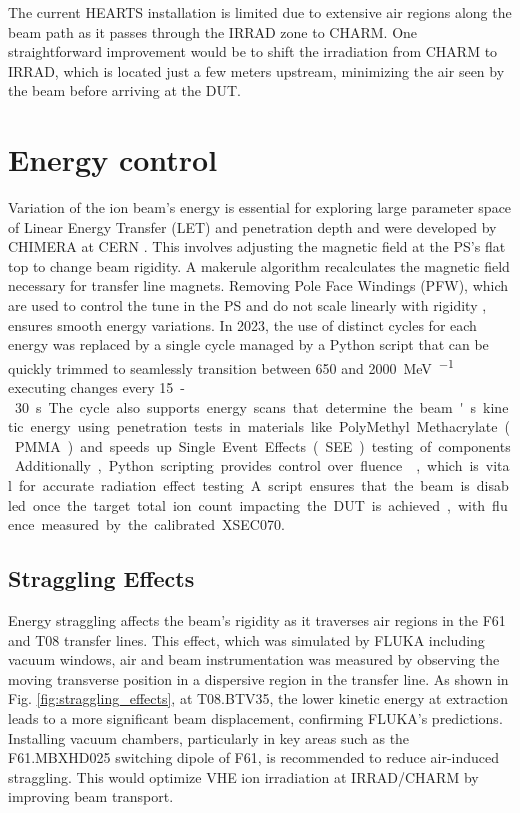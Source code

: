 \documentclass[a4paper,
               biblatex,     %
               ]{jacow}
\begin{document}
The current HEARTS installation is limited due to extensive air regions along the beam path as it passes through the IRRAD zone to CHARM. One straightforward improvement would be to shift the irradiation from CHARM to IRRAD, which is located just a few meters upstream, minimizing the air seen by the beam before arriving at the DUT.






\section{Energy control}

Variation of the ion beam’s energy is essential for exploring large parameter space of Linear Energy Transfer (LET) and penetration depth and were developed by CHIMERA at CERN \cite{fraser:ipac22-wepost012, johnson:ipac23-mopa115, waets:ipac23-thpm128}. This involves adjusting the magnetic field at the PS's flat top to change beam rigidity. A makerule algorithm recalculates the magnetic field necessary for transfer line magnets. Removing Pole Face Windings (PFW), which are used to control the tune in the PS and do not scale linearly with rigidity \cite{Asklöv2005}, ensures smooth energy variations. In 2023, the use of distinct cycles for each energy was replaced by a single cycle managed by a Python script \cite{JohnsonEnergyGUI} that can be quickly trimmed to seamlessly transition between \SI{650}{} and \SI{2000}{\mega\electronvolt\per\nucleon} executing changes every \SI{15}-\SI{30}{\second}. The cycle also supports energy scans that determine the beam's kinetic energy using penetration tests in materials like PolyMethyl Methacrylate (PMMA) and speeds up Single Event Effects (SEE) testing of components. Additionally, Python scripting provides control over fluence \cite{JohnsonFluenceStop}, which is vital for accurate radiation effect testing. A script ensures that the beam is disabled once the target total ion count impacting the DUT is achieved, with fluence measured by the calibrated XSEC070.

\subsection{Straggling Effects}
Energy straggling affects the beam's rigidity as it traverses air regions in the F61 and T08 transfer lines. This effect, which was simulated by FLUKA including vacuum windows, air and beam instrumentation \cite{battistoni_overview_2015} was measured by observing the moving transverse position in a dispersive region in the transfer line. As shown in Fig. \ref{fig:straggling_effects}, at T08.BTV35, the lower kinetic energy at extraction leads to a more significant beam displacement, confirming FLUKA's predictions. Installing vacuum chambers, particularly in key areas such as the F61.MBXHD025 switching dipole of F61, is recommended to reduce air-induced straggling. This would optimize VHE ion irradiation at IRRAD/CHARM by improving beam transport.
\end{document}
